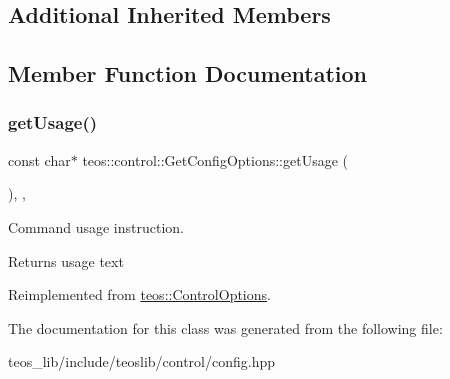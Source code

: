 \subsection*{Additional Inherited Members}


\subsection{Member Function Documentation}
\mbox{\label{classteos_1_1control_1_1_get_config_options_a144b88309b989f2282da43ad56ddb1a6}} 
\subsubsection{\texorpdfstring{get\+Usage()}{getUsage()}}
{\footnotesize\ttfamily const char$\ast$ teos\+::control\+::\+Get\+Config\+Options\+::get\+Usage (\begin{DoxyParamCaption}{ }\end{DoxyParamCaption})\hspace{0.3cm}{\ttfamily [inline]}, {\ttfamily [protected]}, {\ttfamily [virtual]}}



Command \textquotesingle{}usage\textquotesingle{} instruction. 

\begin{DoxyReturn}{Returns}
usage text 
\end{DoxyReturn}


Reimplemented from \mbox{\hyperlink{classteos_1_1_control_options_a0aa5671f9bc750ed5280c26c543874f3}{teos\+::\+Control\+Options}}.



The documentation for this class was generated from the following file\+:\begin{DoxyCompactItemize}
\item 
teos\+\_\+lib/include/teoslib/control/config.\+hpp\end{DoxyCompactItemize}

